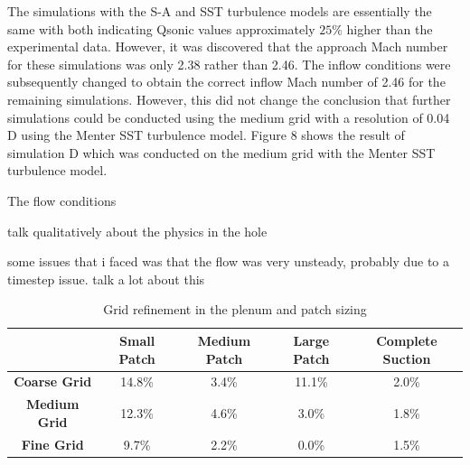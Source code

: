 \documentclass{article}
\begin{document}
The simulations with the S-A and SST turbulence models are essentially the same with both indicating Qsonic values approximately $25\%$ higher than the experimental data. However, it was discovered that the approach Mach number for these simulations was only 2.38 rather than 2.46. The inflow conditions were subsequently changed to obtain the correct inflow Mach number of 2.46 for the remaining simulations. However, this did not change the conclusion that further simulations could be conducted using the medium grid with a resolution of 0.04 D using the Menter SST turbulence model. Figure 8 shows the result of simulation D which was conducted on the medium grid with the Menter SST turbulence model.

The flow conditions 

talk qualitatively about the physics in the hole

some issues that i faced was that the flow was very unsteady, probably due to a timestep issue. talk a lot about this

\begin{table}[!htbp] \centering 
\begin{tabular}[c]{*{5}{c}} \hline
& \textbf{Small Patch} & \textbf{Medium Patch} & \textbf{Large Patch} & \textbf{Complete Suction} \\ \hline
\textbf{Coarse Grid} & 14.8\% & 3.4\% & 11.1\% & 2.0\% \\
\textbf{Medium Grid} & 12.3\% & 4.6\% &  3.0\% & 1.8\% \\
\textbf{Fine Grid}   &  9.7\% & 2.2\% &  0.0\% & 1.5\% \\ \hline
\end{tabular} 
\caption{Grid refinement in the plenum and patch sizing} 
\label{tab:results} \end{table}

\printbibliography
\end{document}
